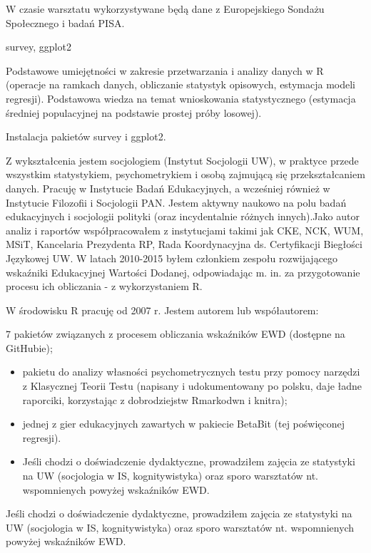 \documentclass[\main/boa.tex]{subfiles}
\begin{document}
W czasie warsztatu wykorzystywane będą dane z Europejskiego Sondażu Społecznego i badań PISA.

\pakiety survey, ggplot2

\umiejetnosci Podstawowe umiejętności w zakresie przetwarzania i analizy danych w R (operacje na ramkach danych, obliczanie statystyk opisowych, estymacja modeli regresji). Podstawowa wiedza na temat wnioskowania statystycznego (estymacja średniej populacyjnej na podstawie prostej próby losowej).

\wymagania Instalacja pakietów survey i ggplot2.

\sylwetkaprowadzacego Z wykształcenia jestem socjologiem (Instytut Socjologii UW), w praktyce przede wszystkim statystykiem, psychometrykiem i osobą zajmującą się przekształcaniem danych. Pracuję w Instytucie Badań Edukacyjnych, a wcześniej również w Instytucie Filozofii i Socjologii PAN. Jestem aktywny naukowo na polu badań edukacyjnych i socjologii polityki (oraz incydentalnie różnych innych).Jako autor analiz i raportów współpracowałem z instytucjami takimi jak CKE, NCK, WUM, MSiT, Kancelaria Prezydenta RP, Rada Koordynacyjna ds. Certyfikacji Biegłości Językowej UW. W latach 2010-2015 byłem członkiem zespołu rozwijającego wskaźniki Edukacyjnej Wartości Dodanej, odpowiadając m. in. za przygotowanie procesu ich obliczania - z wykorzystaniem R.

W środowisku R pracuję od 2007 r. Jestem autorem lub współautorem:

7 pakietów związanych z procesem obliczania wskaźników EWD (dostępne na GitHubie);
\begin{itemize}
\item pakietu do analizy własności psychometrycznych testu przy pomocy narzędzi z Klasycznej Teorii Testu (napisany i udokumentowany po polsku, daje ładne raporciki, korzystając z dobrodziejstw Rmarkodwn i knitra);
\item jednej z gier edukacyjnych zawartych w pakiecie BetaBit (tej poświęconej regresji).
\item Jeśli chodzi o doświadczenie dydaktyczne, prowadziłem zajęcia ze statystyki na UW (socjologia w IS, kognitywistyka) oraz sporo warsztatów nt. wspomnienych powyżej wskaźników EWD.
\end{itemize}

Jeśli chodzi o doświadczenie dydaktyczne, prowadziłem zajęcia ze statystyki na UW (socjologia w IS, kognitywistyka) oraz sporo warsztatów nt. wspomnienych powyżej wskaźników EWD.
\end{document}
